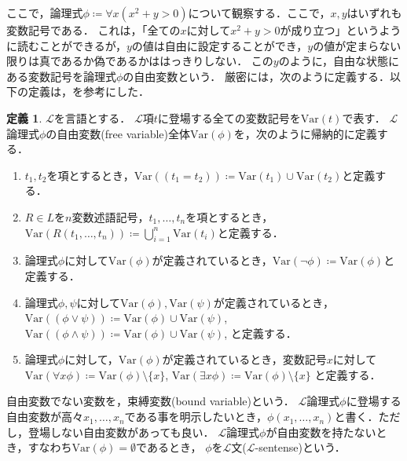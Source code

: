 \documentclass[uplatex, dvipdfmx]{jsarticle}
\numberwithin{equation}{section}
\newcommand{\Var}{\mathrm{Var}}
\theoremstyle{definition}
\newtheorem{definition}{定義}[section]
\begin{document}
ここで，論理式$\phi \coloneqq \forall x (x^2 + y > 0)$について観察する．ここで，$x,y$はいずれも変数記号である．
これは，「全ての$x$に対して$x^2 + y > 0$が成り立つ」というように読むことができるが，$y$の値は自由に設定することができ，$y$の値が定まらない限りは真であるか偽であるかははっきりしない．
この$y$のように，自由な状態にある変数記号を論理式$\phi$の自由変数という．
厳密には，次のように定義する．以下の定義は，\cite[定義 1.5.1]{C3041}を参考にした．

\begin{definition}
     $\mathcal{L}$を言語とする．
     $\mathcal{L}$項$t$に登場する全ての変数記号を$\Var(t)$で表す．
     $\mathcal{L}$論理式$\phi$の自由変数(free variable)全体$\Var(\phi)$を，次のように帰納的に定義する．
     \begin{enumerate}
          \item $t_1, t_2$を項とするとき，$\Var((t_1=t_2))\coloneqq\Var(t_1)\cup\Var(t_2)$と定義する．
          \item $R \in L$を$n$変数述語記号，$t_1, \dots, t_n$を項とするとき，$\Var(R(t_1, \dots, t_n))\coloneqq \bigcup_{i=1}^n \Var(t_i)$と定義する．
          \item 論理式$\phi$に対して$\Var(\phi)$が定義されているとき，$\Var(\lnot \phi)\coloneqq\Var(\phi)$と定義する．
          \item 論理式$\phi, \psi$に対して$\Var(\phi), \Var(\psi)$が定義されているとき，
          $\Var((\phi \lor \psi))\coloneqq\Var(\phi)\cup\Var(\psi)$,
          $\Var((\phi \land \psi))\coloneqq\Var(\phi)\cup\Var(\psi)$,
          と定義する．
          \item 論理式$\phi$に対して，$\Var(\phi)$が定義されているとき，変数記号$x$に対して
          $\Var(\forall x\phi)\coloneqq\Var(\phi) \setminus \{x\}$,
          $\Var(\exists x\phi)\coloneqq\Var(\phi) \setminus \{x\}$
          と定義する．
     \end{enumerate}
     自由変数でない変数を，束縛変数(bound variable)という．
     $\mathcal{L}$論理式$\phi$に登場する自由変数が高々$x_1, \dots, x_n$である事を明示したいとき，$\phi(x_1, \dots, x_n)$と書く．ただし，登場しない自由変数があっても良い．
     $\mathcal{L}$論理式$\phi$が自由変数を持たないとき，すなわち$\Var(\phi)=\emptyset$であるとき，
     $\phi$を$\mathcal{L}$文($\mathcal{L}$-sentense)という．
\end{definition}
\end{document}
